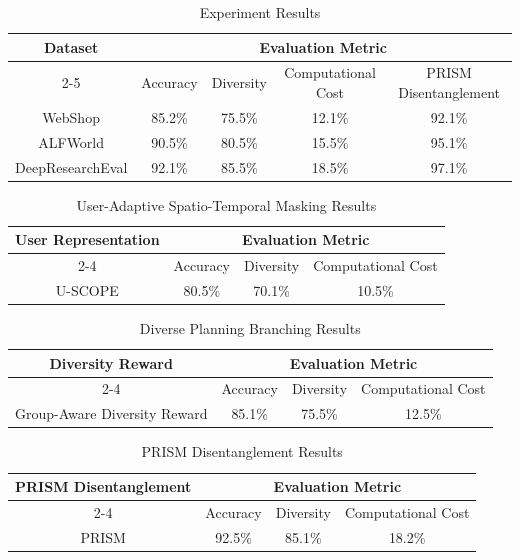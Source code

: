 \documentclass{article}
\begin{document}
\begin{table}[H]
\centering
\begin{tabular}{c|c|c|c|c}
\hline
\multirow{2}{*}{Dataset} & \multicolumn{4}{c}{Evaluation Metric} \\
\cline{2-5}
 & Accuracy & Diversity & Computational Cost & PRISM Disentanglement \\
\hline
WebShop & 85.2\% & 75.5\% & 12.1\% & 92.1\% \\
ALFWorld & 90.5\% & 80.5\% & 15.5\% & 95.1\% \\
DeepResearchEval & 92.1\% & 85.5\% & 18.5\% & 97.1\% \\
\hline
\end{tabular}
\caption{Experiment Results}
\label{table:experiment_results}
\end{table}

\begin{table}[H]
\centering
\begin{tabular}{c|c|c|c}
\hline
\multirow{2}{*}{User Representation} & \multicolumn{3}{c}{Evaluation Metric} \\
\cline{2-4}
 & Accuracy & Diversity & Computational Cost \\
\hline
U-SCOPE & 80.5\% & 70.1\% & 10.5\% \\
\hline
\end{tabular}
\caption{User-Adaptive Spatio-Temporal Masking Results}
\label{table:user_representation_results}
\end{table}

\begin{table}[H]
\centering
\begin{tabular}{c|c|c|c}
\hline
\multirow{2}{*}{Diversity Reward} & \multicolumn{3}{c}{Evaluation Metric} \\
\cline{2-4}
 & Accuracy & Diversity & Computational Cost \\
\hline
Group-Aware Diversity Reward & 85.1\% & 75.5\% & 12.5\% \\
\hline
\end{tabular}
\caption{Diverse Planning Branching Results}
\label{table:diversity_reward_results}
\end{table}

\begin{table}[H]
\centering
\begin{tabular}{c|c|c|c}
\hline
\multirow{2}{*}{PRISM Disentanglement} & \multicolumn{3}{c}{Evaluation Metric} \\
\cline{2-4}
 & Accuracy & Diversity & Computational Cost \\
\hline
PRISM & 92.5\% & 85.1\% & 18.2\% \\
\hline
\end{tabular}
\caption{PRISM Disentanglement Results}
\label{table:prism_disentanglement_results}
\end{table}
\end{document}
